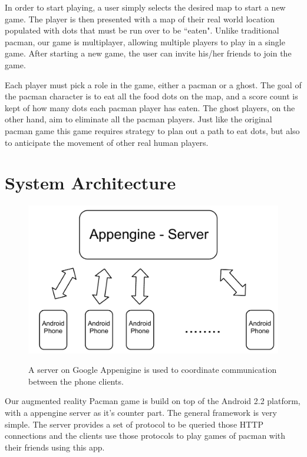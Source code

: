 \documentclass{acm_proc_article-sp}
\begin{document}
In order to start playing, a user simply selects the desired map to start a new game. The player is then presented with a map of their real world location populated with dots that must be run over to be ``eaten". Unlike traditional pacman, our game is multiplayer, allowing multiple players to play in a single game.
After starting a new game, the user can invite his/her friends to join the
game.

Each player must pick a role in the game, either a pacman or a ghost. The
goal of the pacman character is to eat all the food dots on the map, and
a score count is kept of how many dots each pacman player has eaten.
The ghost players, on the other hand, aim to eliminate all the pacman players.
Just like the original pacman game this game requires strategy to plan out a
path to eat dots, but also to anticipate the movement of other real human
players.

\section{System Architecture}

\begin{figure}
\centering
\includegraphics[scale=0.4]{figs/ServerArchitecture}
\label{fig:ServerArchitecture}
\caption{A server on Google Appenigine is used to coordinate communication between the phone clients.}
\end{figure}

Our augmented reality Pacman game is build on top of the Android 2.2
platform, with a appengine server as it's counter part. The general
framework is very simple. The server provides a set of protocol to be
queried those HTTP connections and the clients use those protocols to
play games of pacman with their friends using this app.
\end{document}
